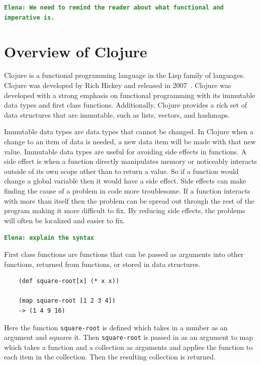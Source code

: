 \documentclass[12pt]{article}
\newcommand{\comment}[1]{{\bf \tt  {#1}}}
\newcommand{\emcomment}[1]{\textcolor{ForestGreen}{\comment{Elena: {#1}}}}
\newcommand{\todo}[1]{\textcolor{blue}{\comment{To Do: {#1}}}}
\newcommand{\mmcomment}[1]{\textcolor{magenta}{\comment{Max: {#1}}}}
\begin{document}
\emcomment{We need to remind the reader about what functional and imperative is.}

\section{Overview of Clojure}\label{sec:clojure}
Clojure is a functional programming language in the Lisp family of languages. Clojure was developed by Rich Hickey and released in 2007~\cite{Hickey:2008}. Clojure was developed with a strong emphasis on functional programming with its immutable data types and first class functions. Additionally, Clojure provides a rich set of data structures that are immutable, such as lists, vectors, and hashmaps.

Immutable data types are data types that cannot be changed. In Clojure when a change to an item of data is needed, a new data item will be made with that new value. Immutable data types are useful for avoiding side effects in functions. A side effect is when a function directly manipulates memory or noticeably interacts outside of its own scope other than to return a value. So if a function would change a global variable then it would have a side effect. Side effects can make finding the cause of a problem in code more troublesome. If a function interacts with more than itself then the problem can be spread out through the rest of the program making it more difficult to fix. By reducing side effects, the problems will often be localized and easier to fix. 

\emcomment{explain the syntax}

First class functions are functions that can be passed as arguments into other functions, returned from functions, or stored in data structures.
\begin{verbatim}
	(def square-root[x] (* x x))
	
	(map square-root [1 2 3 4])
	-> (1 4 9 16)
\end{verbatim}
Here the function \texttt{square-root} is defined which takes in a number as an argument and squares it. Then \texttt{square-root} is passed in as an argument to map which takes a function and a collection as arguments and applies the function to each item in the collection. Then the resulting collection is returned.   
\end{document}
